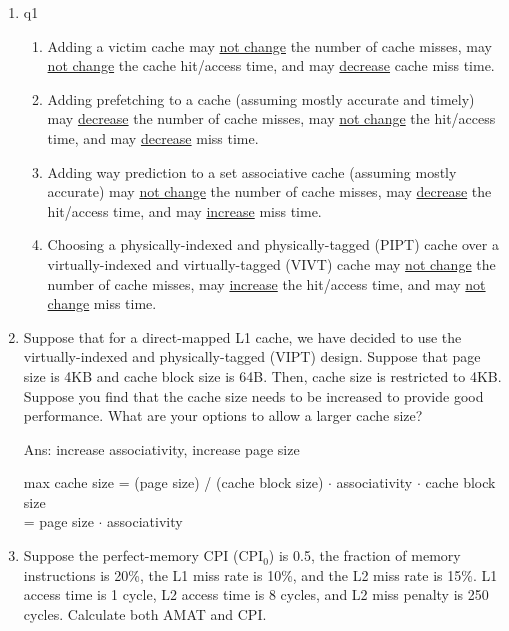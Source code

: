 \documentclass[12pt]{article}
\begin{document}
    \begin{enumerate}
        \item q1
        \begin{enumerate}
            \item Adding a victim cache may \underline{not change} the number of cache misses, may \underline{not change} the 
            cache hit/access time, and may \underline{decrease} cache miss time.

            \item Adding prefetching to a cache (assuming mostly accurate and timely) may \underline{decrease} the number of 
            cache misses, may \underline{not change} the hit/access time, and may \underline{decrease} miss time.

            \item Adding way prediction to a set associative cache (assuming mostly accurate) may \underline{not change} the 
            number of cache misses, may \underline{decrease} the hit/access time, and may \underline{increase} miss time.

            \item Choosing a physically-indexed and physically-tagged (PIPT) cache over a virtually-indexed and virtually-tagged 
            (VIVT) cache may \underline{not change} the number of cache misses, may \underline{increase} the hit/access time, 
            and may \underline{not change} miss time.
        \end{enumerate}

        \item Suppose that for a direct-mapped L1 cache, we have decided to use the virtually-indexed and physically-tagged 
        (VIPT) design. Suppose that page size is 4KB and cache block size is 64B. Then, cache size is restricted to 4KB. 
        Suppose you find that the cache size needs to be increased to provide good performance. What are your options to 
        allow a larger cache size?

        Ans: increase associativity, increase page size

        max cache size = (page size) / (cache block size) $\cdot$ associativity $\cdot$ cache block size\\
        = page size $\cdot$ associativity

        \item Suppose the perfect-memory CPI (CPI$_0$) is 0.5, the fraction of memory instructions is 20\%, the L1 miss rate 
        is 10\%, and the L2 miss rate is 15\%. L1 access time is 1 cycle, L2 access time is 8 cycles, and L2 miss penalty 
        is 250 cycles. Calculate both AMAT and CPI.


\end{enumerate}
\end{document}
